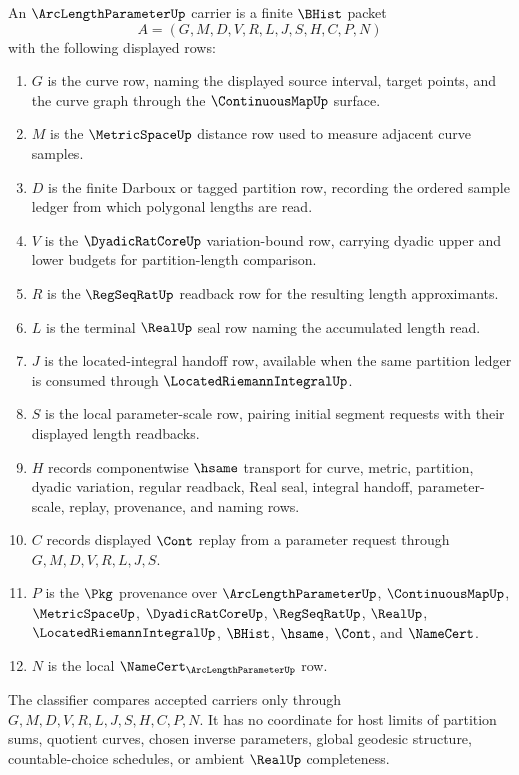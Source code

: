\begin{definition}
\label{def:arc-length-parameter-carrier}
An $\ArcLengthParameterUp$ carrier is a finite $\BHist$ packet
$$
A=(G,M,D,V,R,L,J,S,H,C,P,N)
$$
with the following displayed rows:
\begin{enumerate}
\item $G$ is the curve row, naming the displayed source interval, target points, and the curve graph through the $\ContinuousMapUp$ surface.
\item $M$ is the $\MetricSpaceUp$ distance row used to measure adjacent curve samples.
\item $D$ is the finite Darboux or tagged partition row, recording the ordered sample ledger from which polygonal lengths are read.
\item $V$ is the $\DyadicRatCoreUp$ variation-bound row, carrying dyadic upper and lower budgets for partition-length comparison.
\item $R$ is the $\RegSeqRatUp$ readback row for the resulting length approximants.
\item $L$ is the terminal $\RealUp$ seal row naming the accumulated length read.
\item $J$ is the located-integral handoff row, available when the same partition ledger is consumed through $\LocatedRiemannIntegralUp$.
\item $S$ is the local parameter-scale row, pairing initial segment requests with their displayed length readbacks.
\item $H$ records componentwise $\hsame$ transport for curve, metric, partition, dyadic variation, regular readback, Real seal, integral handoff, parameter-scale, replay, provenance, and naming rows.
\item $C$ records displayed $\Cont$ replay from a parameter request through $G,M,D,V,R,L,J,S$.
\item $P$ is the $\Pkg$ provenance over $\ArcLengthParameterUp$, $\ContinuousMapUp$, $\MetricSpaceUp$, $\DyadicRatCoreUp$, $\RegSeqRatUp$, $\RealUp$, $\LocatedRiemannIntegralUp$, $\BHist$, $\hsame$, $\Cont$, and $\NameCert$.
\item $N$ is the local $\NameCert_{\ArcLengthParameterUp}$ row.
\end{enumerate}
The classifier compares accepted carriers only through $G,M,D,V,R,L,J,S,H,C,P,N$. It has no coordinate for host limits of partition sums, quotient curves, chosen inverse parameters, global geodesic structure, countable-choice schedules, or ambient $\RealUp$ completeness.
\end{definition}

